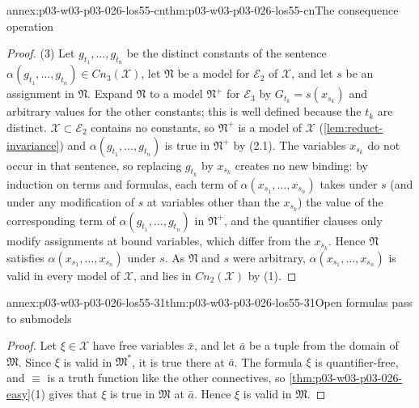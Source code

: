 \begin{annexitem}{annex:p03-w03-p03-026-los55-cn}{thm:p03-w03-p03-026-los55-cn}{The consequence operation}
\begin{proof}
(3) Let \(g_{t_1},\ldots,g_{t_n}\) be the distinct constants of the sentence
\(\alpha(g_{t_1},\ldots,g_{t_n})\in\mathit{Cn}_3(\mathcal X)\), let
\(\mathfrak N\) be a model for \(\mathcal E_2\) of \(\mathcal X\), and let
\(s\) be an assignment in \(\mathfrak N\).  Expand \(\mathfrak N\) to a model
\(\mathfrak N^+\) for \(\mathcal E_3\) by \(G_{t_k}=s(x_{s_k})\) and arbitrary
values for the other constants; this is well defined because the \(t_k\) are
distinct.  \(\mathcal X\subset\mathcal E_2\) contains no constants, so
\(\mathfrak N^+\) is a model of \(\mathcal X\) (\cref{lem:reduct-invariance})
and \(\alpha(g_{t_1},\ldots,g_{t_n})\) is true in \(\mathfrak N^+\) by (2.1).
The variables \(x_{s_k}\) do not occur in that sentence, so replacing
\(g_{t_k}\) by \(x_{s_k}\) creates no new binding: by induction on terms and
formulas, each term of \(\alpha(x_{s_1},\ldots,x_{s_n})\) takes under \(s\)
(and under any modification of \(s\) at variables other than the
\(x_{s_k}\)) the value of the corresponding term of
\(\alpha(g_{t_1},\ldots,g_{t_n})\) in \(\mathfrak N^+\), and the quantifier
clauses only modify assignments at bound variables, which differ from the
\(x_{s_k}\).  Hence \(\mathfrak N\) satisfies
\(\alpha(x_{s_1},\ldots,x_{s_n})\) under \(s\).  As \(\mathfrak N\) and \(s\)
were arbitrary, \(\alpha(x_{s_1},\ldots,x_{s_n})\) is valid in every model of
\(\mathcal X\), and lies in \(\mathit{Cn}_2(\mathcal X)\) by (1).
\end{proof}
\end{annexitem}

\begin{annexitem}{annex:p03-w03-p03-026-los55-31}{thm:p03-w03-p03-026-los55-31}{Open formulas pass to submodels}
\begin{proof}
Let \(\xi\in\mathcal X\) have free variables \(\bar x\), and let \(\bar a\) be
a tuple from the domain of \(\mathfrak M\).  Since \(\xi\) is valid in
\(\mathfrak M^*\), it is true there at \(\bar a\).  The formula \(\xi\) is
quantifier-free, and \(\equiv\) is a truth function like the other
connectives, so \cref{thm:p03-w03-p03-026-easy}(1) gives that \(\xi\) is
true in \(\mathfrak M\) at \(\bar a\).  Hence \(\xi\) is valid in
\(\mathfrak M\).
\end{proof}
\end{annexitem}

